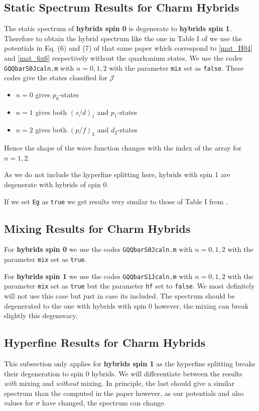 \documentclass[11pt, a4paper]{article}
\begin{document}
\subsection{Static Spectrum Results for Charm Hybrids}
The static spectrum of \textbf{hybrids spin 0} is degenerate to \textbf{hybrids spin 1}. Therefore to obtain the hybrid spectrum like the one in Table I of \cite{Oncala:2017hop} we use the potentials in Eq. (6) and (7) of that same paper which correspond to \eqref{mat_H04} and \eqref{mat_6x6} respectively without the quarkonium states. We use the codes \texttt{GQQbarS0Jcaln.m} with $n=0,1,2$ with the parameter \texttt{mix} set as \texttt{false}. These codes give the states classified for $\mathcal{J}$
\begin{itemize}
    \item $n=0$ gives $p_0$-states
    \item $n=1$ gives both $(s/d)_1$ and $p_1$-states
    \item $n=2$ gives both $(p/f)_2$ and $d_2$-states
\end{itemize}
Hence the shape of the wave function changes with the index of the array for $n=1,2$.

As we do not include the hyperfine splitting here, hybrids with spin 1 are degenerate with hybrids of spin 0.

If we set \texttt{Eg} as \texttt{true} we get results very similar to those of Table I from \cite{Oncala:2017hop}.


\subsection{Mixing Results for Charm Hybrids}
For \textbf{hybrids spin 0} we use the codes \texttt{GQQbarS0Jcaln.m} with $n=0,1,2$ with the parameter \texttt{mix} set as \texttt{true}.

For \textbf{hybrids spin 1} we use the codes \texttt{GQQbarS1Jcaln.m} with $n=0,1,2$ with the parameter \texttt{mix} set as \texttt{true} but the parameter \texttt{hf} set to \texttt{false}. 
We most definitely will not use this case but just in case its included. The spectrum should be degenerated to the one with hybrids with spin 0 however, the mixing can break slightly this degeneracy.

\subsection{Hyperfine Results for Charm Hybrids}
This subsection only applies for \textbf{hybrids spin 1} as the hyperfine splitting breaks their degeneration to spin 0 hybrids. We will differentiate between the results \textit{with} mixing and \textit{without} mixing. In principle, the last should give a similar spectrum than the computed in the paper \cite{Soto:2023lbh} however, as our potentials and also values for $\sigma$ have changed, the spectrum can change.
\end{document}
